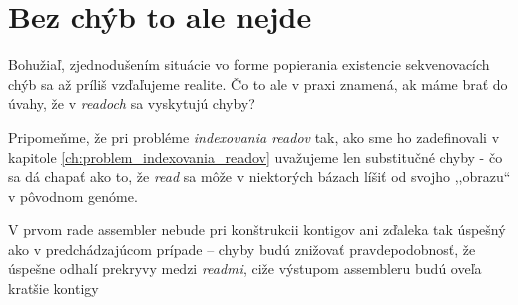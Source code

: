 
\section{Bez chýb to ale nejde}
Bohužiaľ, zjednodušením situácie vo forme popierania existencie sekvenovacích chýb sa až príliš vzďaľujeme realite. Čo to ale v praxi znamená, ak máme brať do úvahy, že v \emph{readoch} sa vyskytujú chyby?

Pripomeňme, že pri probléme \emph{indexovania readov} tak, ako sme ho zadefinovali v kapitole \ref{ch:problem_indexovania_readov} uvažujeme len substitučné chyby - čo sa dá chapať ako to, že \emph{read} sa môže v niektorých bázach líšiť od svojho ,,obrazu`` v pôvodnom genóme.

V prvom rade assembler nebude pri konštrukcii kontigov ani zďaleka tak úspešný ako v predchádzajúcom prípade -- chyby budú znižovať pravdepodobnosť, že úspešne odhalí prekryvy medzi \emph{readmi}, ciže výstupom assembleru budú oveľa kratšie kontigy  






